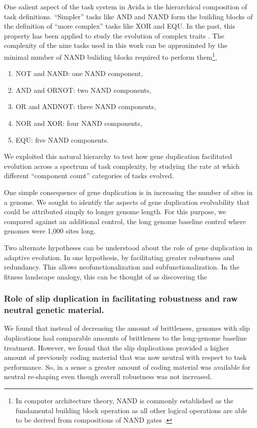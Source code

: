 One salient aspect of the task system in Avida is the hierarchical composition of task definitions.
``Simpler'' tasks like AND and NAND form the building blocks of the definition of ``more complex'' tasks like XOR and EQU.
In the past, this property has been applied to study the evolution of complex traits \citep{TODO}.
The complexity of the nine tasks used in this work can be approximted by the minimal number of NAND buliding blocks required to perform them\footnote{
In computer architecture theory, NAND is commonly established as the fundamental building block operation as all other logical operations are able to be derived from compositions of NAND gates \citep{TODO}.
},
\begin{enumerate}
\item NOT and NAND: one NAND component,
\item AND and ORNOT: two NAND components,
\item OR and ANDNOT: three NAND components,
\item NOR and XOR: four NAND components,
\item EQU: five NAND components.
\end{enumerate}
We exploited this natural hierarchy to test how gene duplication facilitated evolution across a spectrum of task complexity, by studying the rate at which different ``component count'' categories of tasks evolved.

One simple consequence of gene duplication is in increasing the number of sites in a genome.
We sought to identify the aspects of gene duplication evolvability that could be attributed simply to longer genome length.
For this purpose, we compared against an additional control, the long genome baseline control where genomes were 1,000 sites long.

Two alternate hypotheses can be understood about the role of gene duplication in adaptive evolution.
In one hypothesis, by facilitating greater robustness and redundancy.
This allows neofunctionalization and subfunctionalization.
In the fitness landscape analogy, this can be thought of as discovering the 

\subsubsection{Role of slip duplication in facilitating robustness and raw neutral genetic material.}

We found that instead of decreasing the amount of brittleness, genomes with slip duplications had comparable amounts of brittleness to the long-genome baseline treatment.
However, we found that the slip duplications provided a higher amount of previously coding material that was now neutral with respect to task performance.
So, in a sense a greater amount of coding material was available for neutral re-shaping even though overall robustness was not increased.

